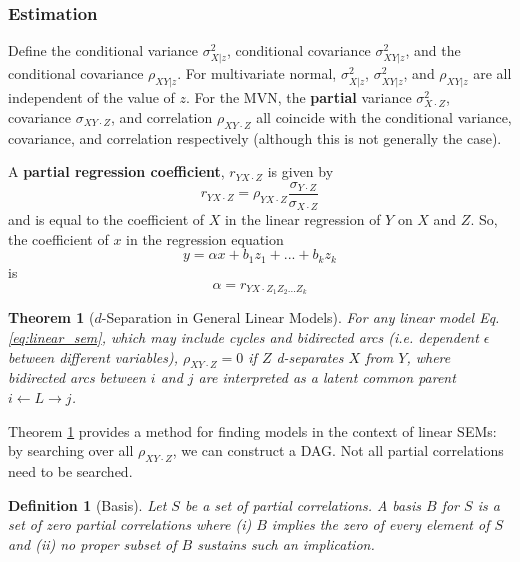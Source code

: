\documentclass[11pt]{article}
\numberwithin{equation}{section}
\newtheorem{thm}{Theorem}[section]
\newtheorem{defn}{Definition}[section]
\begin{document}
\subsubsection{Estimation}

Define the conditional variance $\sigma^2_{X|z}$, conditional covariance $\sigma^2_{XY|z}$, and the conditional covariance $\rho_{XY|z}$. For multivariate normal, $\sigma^2_{X|z}$, $\sigma^2_{XY|z}$, and $\rho_{XY|z}$ are all independent of the value of $z$. For the MVN, the \textbf{partial} variance $\sigma^2_{X\cdot Z}$, covariance $\sigma_{XY\cdot Z}$, and correlation $\rho_{XY\cdot Z}$ all coincide with the conditional variance, covariance, and correlation respectively (although this is not generally the case). 

A \textbf{partial regression coefficient}, $r_{YX\cdot Z}$ is given by
\begin{equation}
r_{YX\cdot Z} = \rho_{YX\cdot Z} \frac{\sigma_{Y\cdot Z}}{\sigma_{X\cdot Z}}
\end{equation}
and is equal to the coefficient of $X$ in the linear regression of $Y$ on $X$ and $Z$. So, the coefficient of $x$ in the regression equation
\begin{equation}
y = \alpha x + b_1 z_1 +...+ b_k z_k
\end{equation}
is
\begin{equation}
\alpha=r_{YX\cdot Z_1Z_2...Z_k}
\end{equation}

\begin{thm}[$d$-Separation in General Linear Models]
For any linear model Eq.\eqref{eq:linear_sem}, which may include cycles and bidirected arcs (i.e. dependent $\epsilon$ between different variables), $\rho_{XY\cdot Z}=0$ if $Z$ d-separates $X$ from $Y$, where bidirected arcs between $i$ and $j$ are interpreted as a latent common parent $i \leftarrow L \rightarrow j$. \label{thm:d-sep-lin-model}
\end{thm}

Theorem \ref{thm:d-sep-lin-model} provides a method for finding models in the context of linear SEMs: by searching over all $\rho_{XY\cdot Z}$, we can construct a DAG. Not all partial correlations need to be searched.

\begin{defn}[Basis]
Let $S$ be a set of partial correlations. A basis $B$ for $S$ is a set of zero partial correlations where (i) $B$ implies the zero of every element of $S$ and (ii) no proper subset of $B$ sustains such an implication.
\end{defn}
\end{document}

